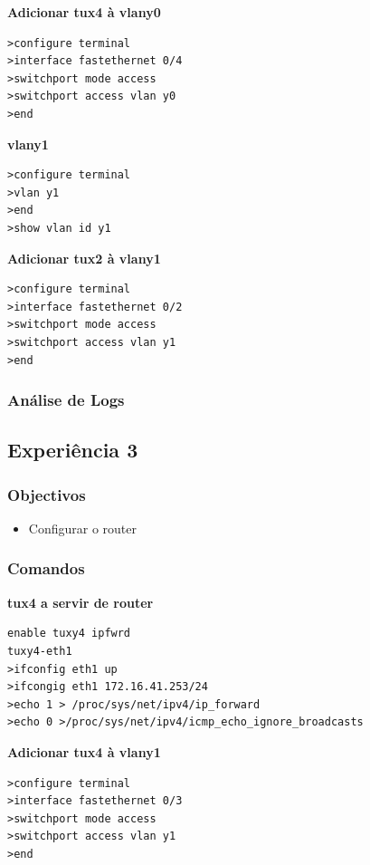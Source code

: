 \documentclass[a4paper,11pt]{article}
\begin{document}
\textbf{Adicionar tux4 à vlany0}

\begin{lstlisting}
>configure terminal
>interface fastethernet 0/4
>switchport mode access
>switchport access vlan y0
>end
\end{lstlisting}

\textbf{vlany1}
\begin{lstlisting}
>configure terminal
>vlan y1
>end
>show vlan id y1
\end{lstlisting}

\textbf{Adicionar tux2 à vlany1}

\begin{lstlisting}
>configure terminal
>interface fastethernet 0/2
>switchport mode access
>switchport access vlan y1
>end
\end{lstlisting}

\subsubsection{Análise de Logs}

\subsection{Experiência 3}
\subsubsection{Objectivos}

\begin{itemize}
\item Configurar o router
\end{itemize}

\subsubsection{Comandos}

\textbf{tux4 a servir de router}

\begin{lstlisting}
enable tuxy4 ipfwrd
tuxy4-eth1
>ifconfig eth1 up
>ifcongig eth1 172.16.41.253/24
>echo 1 > /proc/sys/net/ipv4/ip_forward
>echo 0 >/proc/sys/net/ipv4/icmp_echo_ignore_broadcasts
\end{lstlisting}

\textbf{Adicionar tux4 à vlany1}

\begin{lstlisting}
>configure terminal
>interface fastethernet 0/3
>switchport mode access
>switchport access vlan y1
>end
\end{lstlisting}
\end{document}
